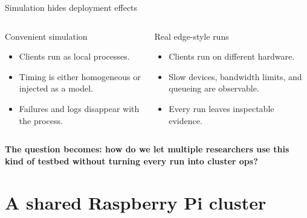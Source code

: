 \documentclass[aspectratio=169,xcolor=dvipsnames]{beamer}
\newcommand{\tightitems}{\setlength\itemsep{0.45em}}
\begin{document}
\begin{frame}{Simulation hides deployment effects}
    \begin{columns}[T,totalwidth=\textwidth]
        \begin{exampleblock}{Convenient simulation}
            \begin{itemize}
                \tightitems
                \item Clients run as local processes.
                \item Timing is either homogeneous or injected as a model.
                \item Failures and logs disappear with the process.
            \end{itemize}
        \end{exampleblock}

        \begin{alertblock}{Real edge-style runs}
            \begin{itemize}
                \tightitems
                \item Clients run on different hardware.
                \item Slow devices, bandwidth limits, and queueing are observable.
                \item Every run leaves inspectable evidence.
            \end{itemize}
        \end{alertblock}
    \end{columns}

    \vspace{1.2em}
    \centering
    \textbf{The question becomes: how do we let multiple researchers use this kind of testbed without turning every run into cluster ops?}
\end{frame}

\section{A shared Raspberry Pi cluster}
\end{document}
